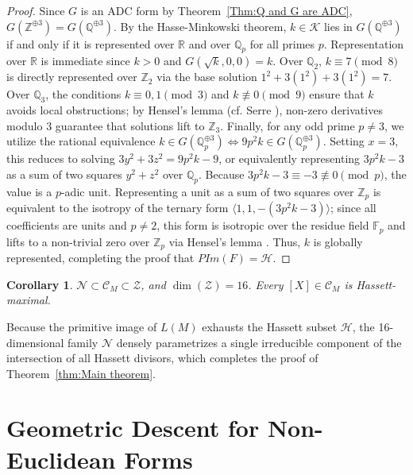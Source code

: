 \documentclass[11pt,letterpaper]{amsart} %
\newtheorem{corollary}[theorem]{Corollary}
\theoremstyle{definition}
\begin{document}
\begin{proof}
Since $G$ is an ADC form by Theorem~\ref{Thm:Q and G are ADC}, $G(\mathbb{Z}^{\oplus 3}) = G(\mathbb{Q}^{\oplus 3})$. %
By the Hasse-Minkowski theorem, $k \in \mathcal{K}$ lies in $G(\mathbb{Q}^{\oplus 3})$ if and only if it is represented over $\mathbb{R}$ and over $\mathbb{Q}_p$ for all primes $p$. %
Representation over $\mathbb{R}$ is immediate since $k > 0$ and $G(\sqrt{k},0,0) = k$. %
Over $\mathbb{Q}_2$, $k \equiv 7 \pmod 8$ is directly represented over $\mathbb{Z}_2$ via the base solution $1^2+3(1^2)+3(1^2) = 7$. %
Over $\mathbb{Q}_3$, the conditions $k \equiv 0,1 \pmod 3$ and $k \not\equiv 0 \pmod 9$ ensure that $k$ avoids local obstructions; by Hensel's lemma (cf. Serre \cite[Chapter IV, Theorem 6]{Serre}), non-zero derivatives modulo $3$ guarantee that solutions lift to $\mathbb{Z}_3$. %
Finally, for any odd prime $p \neq 3$, we utilize the rational equivalence $k \in G(\mathbb{Q}_p^{\oplus 3}) \iff 9p^2k \in G(\mathbb{Q}_p^{\oplus 3})$. %
Setting $x=3$, this reduces to solving $3y^2+3z^2 = 9p^2k - 9$, or equivalently representing $3p^2k - 3$ as a sum of two squares $y^2+z^2$ over $\mathbb{Q}_p$. %
Because $3p^2k-3\equiv-3\not\equiv0 \pmod{p}$, the value is a $p$-adic unit. Representing a unit as a sum of two squares over $\mathbb{Z}_p$ is equivalent to the isotropy of the ternary form $\langle 1, 1, -(3p^2k-3) \rangle$; since all coefficients are units and $p \neq 2$, this form is isotropic over the residue field $\mathbb{F}_p$ and lifts to a non-trivial zero over $\mathbb{Z}_p$ via Hensel's lemma \cite{parimala2013}.
Thus, $k$ is globally represented, completing the proof that $PIm(F) = \mathcal{H}$. %
\end{proof}

\begin{corollary}
$\mathcal{N} \subset \mathcal{C}_M \subset \mathcal{Z}$, and $\dim(\mathcal{Z}) = 16$. %
Every $[X] \in \mathcal{C}_M$ is Hassett-maximal. %
\end{corollary}

Because the primitive image of $L(M)$ exhausts the Hassett subset $\mathcal{H}$, the 16-dimensional family $\mathcal{N}$ densely parametrizes a single irreducible component of the intersection of all Hassett divisors, which completes the proof of Theorem~\ref{thm:Main theorem}. %

\appendix

\section{Geometric Descent for Non-Euclidean Forms}
\label{app:adc}
\end{document}
